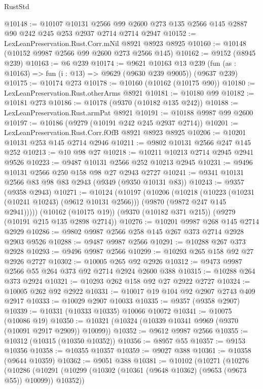 \begin{lexlean}{RustStd}
\begin{coremodule}
@10148 := @10107
    @10131
    @2566
    @99
    @2600
    @273
    @135
    @2566
    @145
    @2887
    @90
    @242
    @245
    @253
    @2937
    @2714
    @2714
    @2947
@10152 := LexLeanPreservation.Rust.Corr.mNil @8921 @8923 @8925
@10160 := @10148 (@10152 @9987 @2566 @99 @2600 @273 @2566 @145)
@10162 := @9152 (@8945 @239)
@10163 := @6 @239
@10174 := @9621
    @10163
    @13
    @239
    (fun (as : @10163) => fun (i : @13) => @9629 (@9630 @239 @9005))
    (@9637 @239)
@10175 := @10174 @273
@10178 := @10160 (@10162 (@10175 @90))
@10180 := LexLeanPreservation.Rust.otherArms @8921
@10181 := @10180 @99
@10182 := @10181 @273
@10186 := @10178 (@9370 (@10182 @135 @242))
@10188 := LexLeanPreservation.Rust.armPat @8921
@10191 := @10188 @9987 @99 @2600
@10197 := @10186 (@9279 (@10191 @242 @245 @2937 @2714))
@10201 := LexLeanPreservation.Rust.Corr.fOfB @8921 @8923 @8925
@10206 := @10201 @10131 @253 @145 @2714 @2946
@10211 := @9802 @10131 @2566 @247 @145 @252
@10213 := @10 @98 @27
@10218 := @10211 @10213 @2714 @2945 @2941 @9526
@10223 := @9487 @10131 @2566 @252 @10213 @2945
@10231 := @9496 @10131 @2566 @250 @158 @98 @27 @2943 @2727
@10241 := @9341 @10131 @2566 @83 @98 @83 @2943 (@9349 (@9350 @10131 @83))
@10243 := @9357 (@9358 @2943)
@10271 := @10124
    (@10197
      (@10206
        (@10218
          (@10223 (@10231 (@10241 @10243) (@9612 @10131 @2566)))
          (@9870 (@9872 @247 @145 @2941)))))
    (@10162 (@10175 @19))
    (@9370 (@10182 @371 @215))
    (@9279 (@10191 @215 @135 @2898 @2714))
@10276 := @10201 @9987 @268 @145 @2714 @2929
@10286 := @9802 @9987 @2566 @258 @145 @267 @373 @2714 @2928 @2903 @9526
@10288 := @9487 @9987 @2566
@10291 := @10288 @267 @373 @2928
@10293 := @9496 @9987 @2566
@10299 := @10293 @265 @158 @92 @27 @2926 @2727
@10302 := @10005 @265 @92 @2926
@10312 := @9473 @9987 @2566 @55 @264 @373 @92 @2714 @2924 @2600 @388
@10315 := @10288 @264 @373 @2924
@10321 := @10293 @262 @158 @92 @27 @2922 @2727
@10324 := @10005 @262 @92 @2922
@10331 := @10017 @19 @104 @92 @2907 @2743 @409 @2917
@10333 := @10029 @2907 @10033
@10335 := @9357 (@9358 @2907)
@10339 := @10331 (@10333 @10335) @10066 @10072
@10341 := @10075 (@10086 @19)
@10350 := @10321 (@10324 (@10339 @10341 @9969 (@9370 (@10091 @2917 @2909)) @10099))
@10352 := @9612 @9987 @2566
@10355 := @10312 (@10315 (@10350 @10352))
@10356 := @8957 @55
@10357 := @9153 @10356
@10358 := @10355 @10357
@10359 := @9027 @388
@10361 := @10358 (@9644 @10359)
@10362 := @9051 @388
@10381 := @10102
    (@10271
      (@10276
        (@10286
          (@10291 (@10299 (@10302 (@10361 (@9648 @10362) (@9653 (@9673 @55)) @10099)) @10352))

\end{coremodule}
\end{lexlean}
